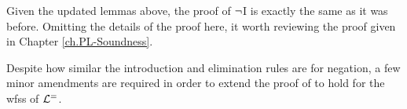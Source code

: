 Given the updated lemmas above, the proof of $\neg$I is exactly the same as it was before.
Omitting the details of the proof here, it worth reviewing the proof given in Chapter \ref{ch.PL-Soundness}.



%
%

Despite how similar the introduction and elimination rules are for negation, a few minor amendments are required in order to extend the proof of  to hold for the wfss of $\mathcal{L}^{=}$.


